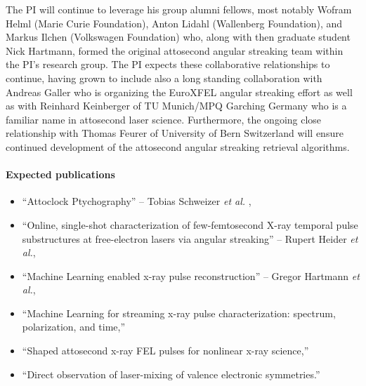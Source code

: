 The PI will continue to leverage his group alumni fellows, most notably Wofram Helml (Marie Curie Foundation), Anton Lidahl (Wallenberg Foundation), and Markus Ilchen (Volkswagen Foundation) who, along with then graduate student Nick Hartmann, formed the original attosecond angular streaking team within the PI's research group.
The PI expects these collaborative relationships to continue, having grown to include also a long standing collaboration with Andreas Galler who is organizing the EuroXFEL angular streaking effort as well as with Reinhard Keinberger of TU Munich/MPQ Garching Germany who is a familiar name in attosecond laser science.
Furthermore, the ongoing close relationship with Thomas Feurer of University of Bern Switzerland will ensure continued development of the attosecond angular streaking retrieval algorithms.

\paragraph{Expected publications}
\begin{itemize}
\item``Attoclock Ptychography'' -- Tobias Schweizer \textit{et al.} \cite{Feurer2018},
\item ``Online, single-shot characterization of few-femtosecond X-ray temporal pulse substructures at free-electron lasers via angular streaking'' -- Rupert Heider \textit{et al.},
\item ``Machine Learning enabled x-ray pulse reconstruction'' --  Gregor Hartmann \textit{et al.},
\item ``Machine Learning for streaming x-ray pulse characterization: spectrum, polarization, and time,''
\item ``Shaped attosecond x-ray FEL pulses for nonlinear x-ray science,''
\item ``Direct observation of laser-mixing of valence electronic symmetries.''
\end{itemize}
